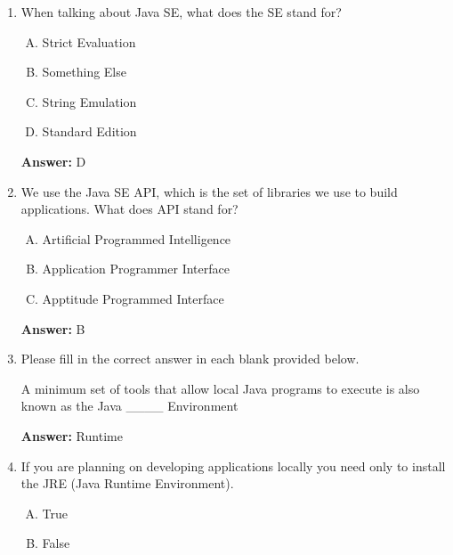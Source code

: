 \documentclass[12pt]{article}
\begin{document}
\begin{enumerate}[1.]
    \item

    When talking about Java SE, what does the SE stand for?

    \begin{enumerate}[A.]
        \item Strict Evaluation
        \item Something Else
        \item String Emulation
        \item Standard Edition
    \end{enumerate}

    \bigskip

    \textbf{Answer:} D

    \item

    We use the Java SE API, which is the set of libraries we use to build applications.
    What does API stand for?

    \begin{enumerate}[A.]
        \item Artificial Programmed Intelligence
        \item Application Programmer Interface
        \item Apptitude Programmed Interface
    \end{enumerate}

    \bigskip

    \textbf{Answer:} B

    \item

    Please fill in the correct answer in each blank provided below.

    \bigskip

    A minimum set of tools that allow local Java programs to execute is also known as the Java \_\_\_\_  Environment

    \bigskip

    \textbf{Answer:} Runtime

    \item

    If you are planning on developing applications locally you need only to install
    the JRE (Java Runtime Environment).


    \bigskip

    \begin{enumerate}[A.]
        \item True
        \item False
    \end{enumerate}


\end{enumerate}
\end{document}
